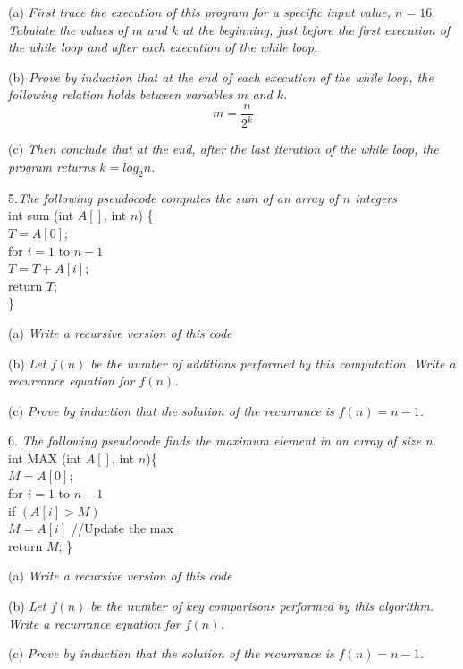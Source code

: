 \documentclass[10pt]{article}
\newcommand\tab[1][.5cm]{\hspace*{#1}}
\begin{document}
(a) \textit{First trace the execution of this program for a specific input value, $n=16$.  Tabulate the values of $m$ and $k$ at the beginning, just before the first execution of the while loop and after each execution of the while loop.}

(b) \textit{Prove by induction that at the end of each execution of the while loop, the following relation holds between variables $m$ and $k$.
}
$$m=\frac{n}{2^k}$$

(c) \textit{Then conclude that at the end, after the last iteration of the while loop, the program returns $k=log_2n$.}

5.\textit{The following pseudocode computes the sum of an array of $n$ integers}\\
\tab int sum (int $A[]$, int $n$) \{\\
\tab $T=A[0]$;\\
\tab for $i=1$ to $n-1$\\
\tab \tab $T=T+A[i]$;\\
\tab return $T$;\\
\tab \}

(a) \textit{Write a recursive version of this code}

(b) \textit{Let $f(n)$ be the number of additions performed by this computation.  Write a recurrance equation for $f(n)$.}

(c) \textit{Prove by induction that the solution of the recurrance is $f(n)=n-1$.}

6. \textit{The following pseudocode finds the maximum element in an array of size n.}\\
\tab int MAX (int $A[]$, int $n$)\{\\
\tab $M = A[0]$;\\
\tab for $i=1$ to $n-1$\\
\tab \tab if $(A[i] > M)$\\
\tab \tab \tab $M=A[i]$ //Update the max\\
\tab return $M$;
\tab \}

(a) \textit{Write a recursive version of this code}

(b) \textit{Let $f(n)$ be the number of key comparisons performed by this algorithm.  Write a recurrance equation for $f(n)$.}

(c) \textit{Prove by induction that the solution of the recurrance is $f(n)=n-1$.}
\end{document}
